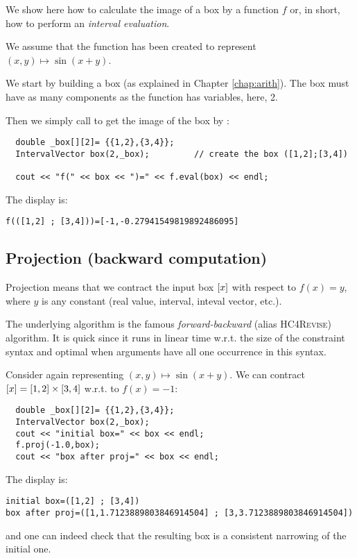 We show here how to calculate the image of a box by a function $f$ or, in short, how
to perform an {\it interval evaluation}.

We assume that the function  has been created to represent $(x,y)\mapsto \sin(x+y)$.

We start by building a box (as explained in Chapter \ref{chap:arith}).
The box must have as many components as the function has variables, here, 2.

Then we simply call  to get the image of the box by :

\begin{lstlisting}
  double _box[][2]= {{1,2},{3,4}};
  IntervalVector box(2,_box);         // create the box ([1,2];[3,4])

  cout << "f(" << box << ")=" << f.eval(box) << endl; 
\end{lstlisting}

The display is:
\begin{verbatim}
f(([1,2] ; [3,4]))=[-1,-0.27941549819892486095]
\end{verbatim}

\subsection{Projection (backward computation)}
	
Projection means that we contract the input box $[x]$
with respect to $f(x)=y$, where $y$ is any constant (real value, interval,
inteval vector, etc.).

The underlying algorithm is the famous {\it forward-backward} (alias \textsc{HC4Revise})
algorithm. It is quick since it runs in linear time w.r.t. the size
of the constraint syntax and optimal when arguments have all one occurrence
in this syntax.

Consider again  representing $(x,y)\mapsto\sin(x+y)$.
We can contract $[x]=[1,2]\times[3,4]$ w.r.t.
to $f(x)=-1$:

\begin{lstlisting}
  double _box[][2]= {{1,2},{3,4}};
  IntervalVector box(2,_box);
  cout << "initial box=" << box << endl;
  f.proj(-1.0,box);
  cout << "box after proj=" << box << endl;
\end{lstlisting}
The display is:
\begin{verbatim}
initial box=([1,2] ; [3,4])
box after proj=([1,1.7123889803846914504] ; [3,3.7123889803846914504])
\end{verbatim}
and one can indeed check that the resulting box is a consistent narrowing
of the initial one.

